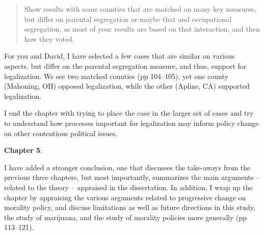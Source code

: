 \documentclass[12pt,stdletter,dateno,sigleft]{newlfm} %
\begin{document}
\begin{newlfm}
\begin{quotation}{\color{red}\noindent \footnotesize
Show results with some counties that are matched on many key measures, but differ on parental segregation or maybe that and occupational segregation, as most of your results are based on that interaction, and then how they voted. 
}
\end{quotation}


For you and David, I have selected a few cases that are similar on various aspects, but differ on the parental segregation measure, and thus, support for legalization. We see two matched counties (pp 104--105), yet one county (Mahoning, OH) opposed legalization, while the other (Apline, CA) supported legalization. 


I end the chapter with trying to place the case in the larger set of cases and try to understand how processes important for legalization may inform policy change on other contentious political issues. \newline



\textbf{Chapter 5}: 

I have added a stronger conclusion, one that discusses the take-aways from the previous three chapters, but most importantly, summarizes the main arguments --related to the theory -- appraised in the dissertation. In addition, I wrap up the chapter by appraising the various arguments related to progressive change on morality policy, and discuss limitations as well as future directions in this study, the study of marijuana, and the study of morality policies more generally (pp 113--121).


\end{newlfm}
\end{document}
